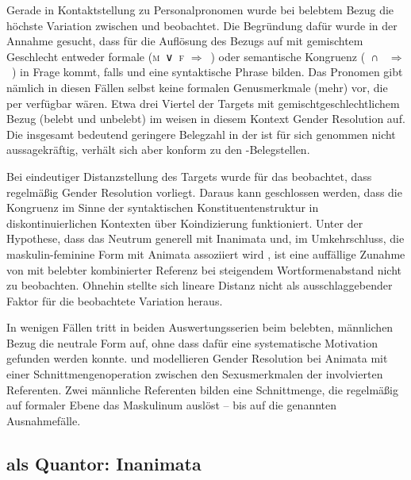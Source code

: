 Gerade in Kontaktstellung zu Personalpronomen wurde bei belebtem Bezug die
höchste Variation zwischen  und  beobachtet. Die
Begründung dafür wurde in der Annahme gesucht, dass für die Auflösung des
Bezugs auf  mit gemischtem Geschlecht entweder formale
(\textsc{m}~∨~\textsc{f} $\Rightarrow$~) oder semantische Kongruenz
(\SM{}~∩~\SF{} $\Rightarrow$~) in Frage kommt, falls  und
 eine syntaktische Phrase bilden. Das Pronomen gibt nämlich in
diesen Fällen selbst keine formalen Genus\-merk\-male (mehr) vor, die per
 verfügbar wären. Etwa drei Viertel der Targets mit
gemischtgeschlechtlichem Bezug (belebt und unbelebt) im \CAO{} weisen in diesem
Kontext Gender Resolution auf. Die insgesamt bedeutend geringere Belegzahl in
der \KC{} ist für sich genommen nicht aussagekräftig, verhält sich aber konform
zu den \CAO-Belegstellen.

Bei eindeutiger Distanzstellung des Targets wurde für das \CAO{} beobachtet,
dass regel\-mäßig Gender Re\-solu\-tion vorliegt. Daraus kann geschlossen
werden, dass die Kongruenz im Sinne der syntaktischen Konstituentenstruktur in
diskontinuierlichen Kontexten über Koindizierung funktioniert. Unter der
Hypothese, dass das Neutrum generell mit Inanimata und, im Umkehrschluss, die
maskulin-feminine Form mit Animata assoziiert wird
\autocite[243--245]{askedal1973}, ist eine auffällige Zunahme von 
mit belebter kombinierter Referenz bei steigendem
Wortformenabstand nicht zu beobachten. Ohnehin stellte
sich lineare Distanz nicht als ausschlaggebender Faktor
für die beob\-ach\-tete Variation heraus.

In wenigen Fällen tritt in beiden Auswertungs\-serien beim belebten, männlichen
Bezug die neutrale Form auf, ohne dass dafür eine systematische Motivation
gefunden werden konnte. \citet{wechslerzlatic2003} und \citet{wechsler2009}
modellieren Gender Resolution bei Animata mit einer Schnittmengenoperation
zwischen den Sexusmerkmalen der involvierten Referenten. Zwei männliche
Referenten bilden eine Schnittmenge, die regelmäßig auf formaler Ebene das
Maskulinum auslöst -- bis auf die genannten Ausnahmefälle.


\subsection{ als Quantor: Inanimata}

